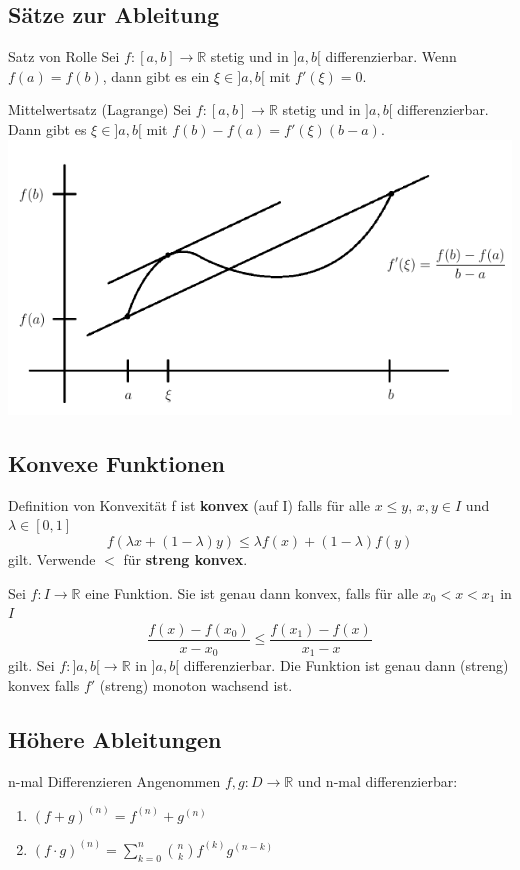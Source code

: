 \documentclass[a4paper,10pt]{article}
\def\R{\mathbb{R}}
\begin{document}
\subsection{Sätze zur Ableitung}
\begin{subbox}{Satz von Rolle}
 Sei $f: [a,b] \to \R$ stetig und in $]a,b[$ differenzierbar. Wenn $f(a) = f(b)$, dann gibt es ein $\xi \in ]a,b[$ mit $f'(\xi) = 0$.
\end{subbox}
\begin{mainbox}{Mittelwertsatz (Lagrange)}
 Sei $f: [a,b] \to \R$ stetig und in $]a,b[$ differenzierbar. Dann gibt es $\xi \in ]a,b[$ mit $f(b) - f(a) = f'(\xi)(b-a)$.
 \includegraphics[width=\linewidth]{mittelwertsatz.png}
\end{mainbox}

\subsection{Konvexe Funktionen}
\begin{mainbox}{Definition von Konvexität}
  f ist \textbf{konvex} (auf I) falls für alle $x \leq y,\, x,y\in I$ und $\lambda \in [0,1]$ \[f(\lambda x + (1-\lambda)y) \leq \lambda f(x) + (1-\lambda)f(y)\] gilt. Verwende $<$ für \textbf{streng konvex}.
\end{mainbox}
Sei $f: I \to \R$ eine Funktion. Sie ist genau dann konvex, falls für alle $x_0 < x < x_1$ in $I$ \[\frac{f(x)-f(x_0)}{x-x_0}\leq \frac{f(x_1)-f(x)}{x_1-x}\] gilt. Sei $f:]a,b[ \to \R$ in $]a,b[$ differenzierbar. Die Funktion ist genau dann (streng) konvex falls $f'$ (streng) monoton wachsend ist.

\subsection{Höhere Ableitungen}
\begin{mainbox}{n-mal Differenzieren}
  Angenommen $f,g: D\to \R$ und n-mal differenzierbar:
  \begin{enumerate}[leftmargin=*]
    \item $(f+g)^{(n)} = f^{(n)} + g^{(n)}$
    \item $(f\cdot g)^{(n)} = \sum\limits_{k=0}^{n}\binom{n}{k}f^{(k)}g^{(n-k)}$ 
  \end{enumerate}
\end{mainbox}
\end{document}
